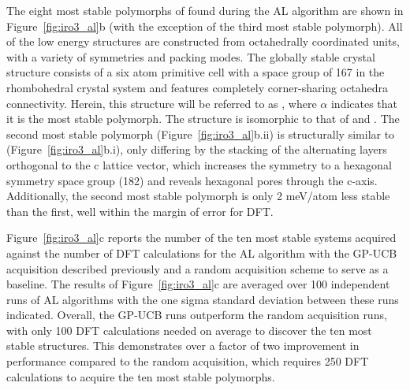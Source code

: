 %
The eight most stable polymorphs of \IrOthree found during the AL algorithm are shown in Figure~\ref{fig:iro3_al}b (with the exception of the third most stable polymorph).
%
All of the low energy \IrOthree structures are constructed from octahedrally coordinated units, with a variety of symmetries and packing modes.
%
The globally stable crystal structure consists of a six atom primitive cell with a space group of 167 in the rhombohedral crystal system and features completely corner-sharing octahedra connectivity.
%
Herein, this structure will be referred to as \aIrOthree, where $\alpha$ indicates that it is the most stable \IrOthree polymorph.
%
The structure is isomorphic to that of  and .
%
The second most stable polymorph
(Figure~\ref{fig:iro3_al}b.ii)
is structurally similar to 
\aIrOthree (Figure~\ref{fig:iro3_al}b.i),
only differing by the stacking of the alternating layers orthogonal to the c lattice vector,
which increases the symmetry to a hexagonal symmetry space group (182) and reveals hexagonal pores through the c-axis.
%
Additionally, the second most stable polymorph is only 2 meV/atom less stable than the first, well within the margin of error for DFT.


%
%
Figure~\ref{fig:iro3_al}c reports the number of the ten most stable systems acquired against the number of DFT calculations for the AL algorithm with the GP-UCB acquisition described previously and a random acquisition scheme to serve as a baseline.
%
The results of Figure~\ref{fig:iro3_al}c are averaged over 100 independent runs of AL algorithms with the one sigma standard deviation between these runs indicated.
%
Overall, the GP-UCB runs outperform the random acquisition runs, with only \num{100} DFT calculations needed on average to discover the ten most stable structures.
%
This demonstrates over a factor of two improvement in performance compared to the random acquisition, which requires \mytilde\num{250} DFT calculations to acquire the ten most stable polymorphs.


